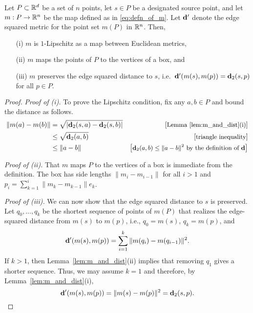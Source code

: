   \begin{prop}\label{prop:m_is_good}
    Let $P\subset\mathbb{R}^d$ be a set of $n$ points, let $s\in P$ be a designated source point, and let $m:P\to \mathbb{R}^n$ be the map defined as in \eqref{eq:defn_of_m}.
    Let $\mathbf{d}'$ denote the edge squared metric for the point set $m(P)$ in $\mathbb{R}^n$.
    Then,
    \begin{enumerate}
      \item[(i)] $m$ is $1$-Lipschitz as a map between Euclidean metrics,
      \item[(ii)] $m$ maps the points of $P$ to the vertices of a box, and
      \item[(iii)] $m$ preserves the edge squared distance to $s$, i.e.\ $\mathbf{d}'(m(s), m(p)) = \mathbf{d}_2(s,p)$ for all $p\in P$.
    \end{enumerate} 
  \end{prop}
  \begin{proof}
    \emph{Proof of (i).} To prove the Lipschitz condition, fix any $a,b\in P$ and bound the distance as follows.
    \begin{align*}
      \|m(a) - m(b)\| 
        &= \sqrt{|\mathbf{d}_2(s,a) - \mathbf{d}_2(s,b)|} &\left[\text{\small{Lemma~\ref{lem:m_and_dist}(i)}}\right]\\
        &\le \sqrt{\mathbf{d}_2(a,b)} &\left[\text{\small{triangle inequality}}\right]\\
        &\le \|a-b\| &\left[\text{\small{$\mathbf{d}_2(a,b)\le \|a-b\|^2$ by the definition of $\mathbf{d}$}}\right]
    \end{align*}

    \noindent
    \emph{Proof of (ii).} That $m$ maps $P$ to the vertices of a box is immediate from the definition.
    The box has side lengths $\|m_i - m_{i-1}\|$ for all $i>1$ and $p_i = \sum_{k=1}^i \|m_k - m_{k-1}\| e_k$.

    \noindent
    \emph{Proof of (iii).} We can now show that the edge squared distance to $s$ is preserved.
    Let $q_0,\ldots, q_k$ be the shortest sequence of points of $m(P)$ that realizes the edge-squared distance from $m(s)$ to $m(p)$, i.e., $q_0 = m(s)$, $q_k = m(p)$, and 
    \[
      \mathbf{d}'(m(s), m(p)) = \sum_{i = 1}^k \|m(q_i) - m(q_{i-1})\|^2.
    \]
    If $k> 1$, then Lemma~\ref{lem:m_and_dist}(ii) implies that removing $q_1$ gives a shorter sequence.
    Thus, we may assume $k = 1$ and therefore, by Lemma~\ref{lem:m_and_dist}(i),
    \[
      \mathbf{d}'(m(s), m(p)) = \|m(s) - m(p)\|^2 = \mathbf{d}_2(s,p).\qedhere
    \]
  \end{proof}
  

